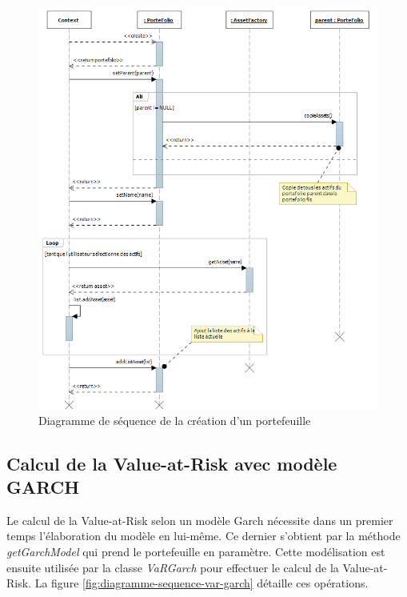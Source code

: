 \documentclass[a4paper,titlepage,french]{report}
\begin{document}
\begin{figure}
  	\center
  	\includegraphics[width=1\textwidth]{diagSeqPortefolio.png}
  	\caption{Diagramme de séquence de la création d'un portefeuille}
    \label{fig:diagramme-sequence-creation-portefeuille}
\end{figure}


\subsection{Calcul de la Value-at-Risk avec modèle GARCH}

Le calcul de la Value-at-Risk selon un modèle Garch nécessite dans un premier temps l'élaboration du modèle en lui-même.
Ce dernier s'obtient par la méthode \textit{getGarchModel} qui prend le portefeuille en paramètre.
Cette modélisation est ensuite utilisée par la classe \textit{VaRGarch} pour effectuer le calcul de la Value-at-Risk.
La figure \ref{fig:diagramme-sequence-var-garch} détaille ces opérations.
\end{document}
